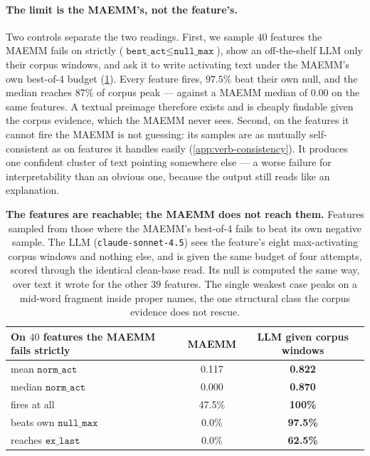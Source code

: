 \paragraph{The limit is the MAEMM's, not the feature's.}
Two controls separate the two readings. First, we sample $40$ features the MAEMM fails on strictly
($\texttt{best\_act} \leq \texttt{null\_max}$), show an off-the-shelf LLM only their corpus windows,
and ask it to write activating text under the MAEMM's own best-of-4 budget
(\cref{tab:llm-baseline}). Every feature fires, $97.5\%$ beat their own null, and the median reaches
$87\%$ of corpus peak --- against a MAEMM median of $0.00$ on the same features. A textual preimage
therefore exists and is cheaply findable given the corpus evidence, which the MAEMM never sees.
Second, on the features it cannot fire the MAEMM is not guessing: its samples are as mutually
self-consistent as on features it handles easily (\cref{app:verb-consistency}). It produces one
confident cluster of text pointing somewhere else --- a worse failure for interpretability than an
obvious one, because the output still reads like an explanation.

\begin{table}[htbp]
\centering
\small
\begin{tabular}{lcc}
\toprule
On $40$ features the MAEMM fails strictly & MAEMM & LLM given corpus windows \\
\midrule
mean $\texttt{norm\_act}$          & 0.117 & \textbf{0.822} \\
median $\texttt{norm\_act}$        & 0.000 & \textbf{0.870} \\
fires at all                       & 47.5\% & \textbf{100\%} \\
beats own $\texttt{null\_max}$     &  0.0\% & \textbf{97.5\%} \\
reaches $\texttt{ex\_last}$        &  0.0\% & \textbf{62.5\%} \\
\bottomrule
\end{tabular}
\caption{\textbf{The features are reachable; the MAEMM does not reach them.} Features sampled from
those where the MAEMM's best-of-4 fails to beat its own negative sample. The LLM
(\texttt{claude-sonnet-4.5}) sees the feature's eight max-activating corpus windows and nothing
else, and is given the same budget of four attempts, scored through the identical clean-base read.
Its null is computed the same way, over text it wrote for the other $39$ features. The single
weakest case peaks on a mid-word fragment inside proper names, the one structural class the corpus
evidence does not rescue.}
\label{tab:llm-baseline}
\end{table}

